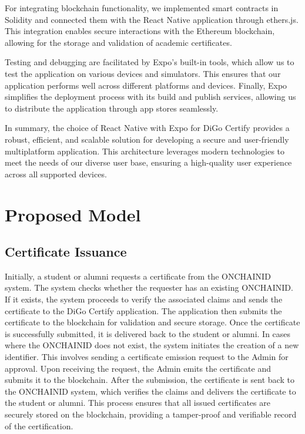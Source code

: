 For integrating blockchain functionality, we implemented smart contracts in Solidity and connected them with the React Native application through ethers.js. This integration enables secure interactions with the Ethereum blockchain, allowing for the storage and validation of academic certificates.

Testing and debugging are facilitated by Expo’s built-in tools, which allow us to test the application on various devices and simulators. This ensures that our application performs well across different platforms and devices. Finally, Expo simplifies the deployment process with its build and publish services, allowing us to distribute the application through app stores seamlessly.

In summary, the choice of React Native with Expo for DiGo Certify provides a robust, efficient, and scalable solution for developing a secure and user-friendly multiplatform application. This architecture leverages modern technologies to meet the needs of our diverse user base, ensuring a high-quality user experience across all supported devices.

\section{Proposed Model}

\subsection{Certificate Issuance}

Initially, a student or alumni requests a certificate from the ONCHAINID~\cite{ONCHAINID} system. The system checks whether the requester has an existing ONCHAINID. If it exists, the system proceeds to verify the associated claims and sends the certificate to the DiGo Certify application. The application then submits the certificate to the blockchain for validation and secure storage. Once the certificate is successfully submitted, it is delivered back to the student or alumni. In cases where the ONCHAINID does not exist, the system initiates the creation of a new identifier. This involves sending a certificate emission request to the Admin for approval. Upon receiving the request, the Admin emits the certificate and submits it to the blockchain. After the submission, the certificate is sent back to the ONCHAINID system, which verifies the claims and delivers the certificate to the student or alumni. This process ensures that all issued certificates are securely stored on the blockchain, providing a tamper-proof and verifiable record of the certification.

